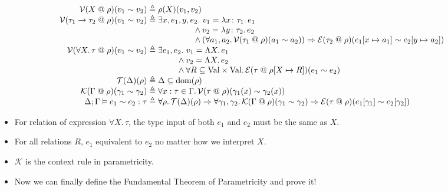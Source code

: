 \documentclass{lecturenotes}
\makeatletter
\newcommand{\tabs}[3]{\ensuremath{\lambda #1 \colon #2.\,#3}}
\newcommand{\fatype}[2]{\ensuremath{\forall #1.\,#2}}
\newcommand{\Abs}[2]{\Lambda #1.\,#2}
\newcommand{\at}{\ensuremath{\mathrel{@}}}
\newcommand{\binval}[4]{\ensuremath{\mathcal{V}(#1 \at #2)(#3 \sim #4)}}
\newcommand{\binexpr}[4]{\ensuremath{\mathcal{E}(#1 \at #2)(#3 \sim #4)}}
\newcommand{\bintypectxt}[2]{\ensuremath{\mathcal{T}(#1)(#2)}}
\newcommand{\binctxt}[4]{\ensuremath{\mathcal{K}(#1 \at #2)(#3 \sim #4)}}
\makeatother
\begin{document}
\[
\begin{array}{r@{\;\triangleq\;}l}
    \binval{X}{\rho}{v_1}{v_2} & \rho(X)(v_1, v_2)\\
    \binval{\tau_1 \to \tau_2}{\rho}{v_1}{v_2} &
        \exists x, e_1, y, e_2.\, \hspace{-1.5em}\begin{array}[t]{l}\hspace{1.15em}v_1 = \tabs{x}{\tau_1}{e_1}\\{} \land v_2 = \tabs{y}{\tau_2}{e_2}\\{} \land (\forall a_1, a_2.\, \binval{\tau_1}{\rho}{a_1}{a_2}) \Rightarrow \binexpr{\tau_2}{\rho}{e_1[x \mapsto a_1]}{e_2[y \mapsto a_2]}\end{array}\\
    \binval{\fatype{X}{\tau}}{\rho}{v_1}{v_2} &
        \exists e_1, e_2.\, \hspace{-1.5em}\begin{array}[t]{l}\hspace{1.15em}v_1 = \Abs{X}{e_1}\\{} \land v_2 = \Abs{X}{e_2}\\ {} \land \forall R \subseteq \text{Val} \times \text{Val}.\, \binexpr{\tau}{\rho[X \mapsto R]}{e_1}{e_2}\end{array}\\

    \bintypectxt{\Delta}{\rho} & \Delta \subseteq \text{dom}(\rho) \\
    \binctxt{\Gamma}{\rho}{\gamma_1}{\gamma_2} & \forall x : \tau \in \Gamma.\, \binval{\tau}{\rho}{\gamma_1(x)}{\gamma_2(x)} \\
    \Delta; \Gamma \vDash e_1 \sim e_2 : \tau & \forall \rho.\, \bintypectxt{\Delta}{\rho} \Rightarrow \forall \gamma_1, \gamma_2.\, \binctxt{\Gamma}{\rho}{\gamma_1}{\gamma_2} \Rightarrow \binexpr{\tau}{\rho}{e_1[\gamma_1]}{e_2[\gamma_2]}    
\end{array}
\]

\begin{itemize}
    \item For relation of expression $\fatype{X}{\tau}$, the type input of both $e_1$ and $e_2$ must be the same as $X$.
    \item For all relations $R$, $e_1$ equivalent to $e_2$ no matter how we interpret $X$.
    \item $\mathcal{K}$ is the context rule in parametricity.
    \item Now we can finally define the Fundamental Theorem of Parametricity and prove it!
\end{itemize}
\end{document}

